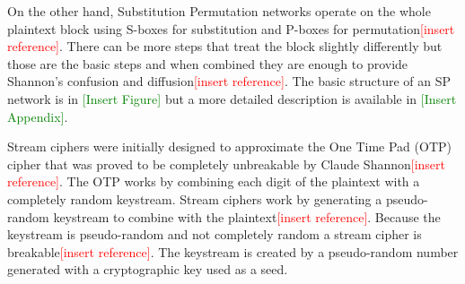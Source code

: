\documentclass[12pt,twoside,a4paper]{report}
\begin{document}
    On the other hand, Substitution Permutation networks operate on the whole plaintext block using S-boxes for substitution and P-boxes for permutation\textcolor{red}{[insert reference]}. There can be more steps that treat the block slightly differently but those are the basic steps and when combined they are enough to provide Shannon's confusion and diffusion\textcolor{red}{[insert reference]}. The basic structure of an SP network is in \textcolor{green}{[Insert Figure]} but a more detailed description is available in \textcolor{green}{[Insert Appendix]}.
    
    
    
    Stream ciphers were initially designed to approximate the One Time Pad (OTP) cipher that was proved to be completely unbreakable by Claude Shannon\textcolor{red}{[insert reference]}. The OTP works by combining each digit of the plaintext with a completely random keystream. Stream ciphers work by generating a pseudo-random keystream to combine with the plaintext\textcolor{red}{[insert reference]}. Because the keystream is pseudo-random and not completely random a stream cipher is breakable\textcolor{red}{[insert reference]}. The keystream is created by a pseudo-random number generated with a cryptographic key used as a seed.
    
\end{document}
